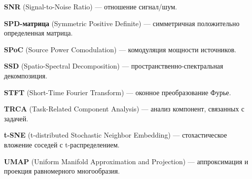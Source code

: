 \textbf{SNR} (Signal-to-Noise Ratio) --- отношение сигнал/шум.

\textbf{SPD-матрица} (Symmetric Positive Definite) --- симметричная положительно определенная матрица.

\textbf{SPoC} (Source Power Comodulation) --- комодуляция мощности источников.

\textbf{SSD} (Spatio-Spectral Decomposition) --- пространственно-спектральная декомпозиция.

\textbf{STFT} (Short-Time Fourier Transform) --- оконное преобразование Фурье.

\textbf{TRCA} (Task-Related Component Analysis) --- анализ компонент, связанных с задачей.

\textbf{t-SNE} (t-distributed Stochastic Neighbor Embedding) --- стохастическое вложение соседей с t-распределением.

\textbf{UMAP} (Uniform Manifold Approximation and Projection) --- аппроксимация и проекция равномерного многообразия.